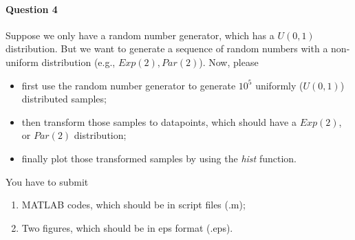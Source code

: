 \documentclass[11pt]{article} %
\begin{document}
\paragraph*{Question 4}

Suppose we only have a random number generator, which has a $U(0, 1)$ distribution. But we want to generate a sequence of random numbers with a non-uniform distribution (e.g., $Exp(2), Par(2)$). Now, please 
\begin{itemize}
\item first use the random number generator to generate $10^5$ uniformly ($U(0, 1)$) distributed samples; 
\item then transform those samples to datapoints, which should have a $Exp(2)$, or $Par(2)$ distribution;
\item finally plot those transformed samples by using the {\it hist} function. 
\end{itemize}
You have to submit 
\begin{enumerate}
\item MATLAB codes, which should be in script files (.m);
\item Two figures, which should be in eps format (.eps).
\end{enumerate}
\end{document}
